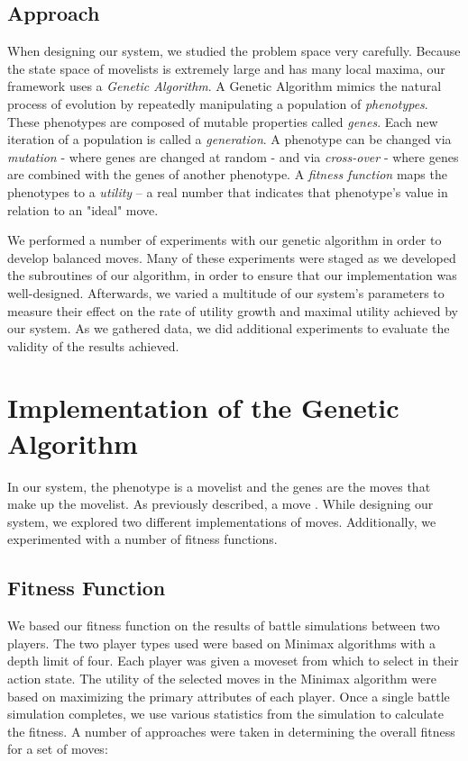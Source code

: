 \documentclass{acm_proc_article-sp}
\begin{document}
\subsection{Approach}

When designing our system, we studied the problem space very carefully. Because the state space of movelists is extremely large and has many local maxima, our framework uses a \textit{Genetic Algorithm}. A Genetic Algorithm mimics the natural process of evolution by repeatedly manipulating a population of \textit{phenotypes}. These phenotypes are composed of mutable properties called \textit{genes}. Each new iteration of a population is called a \textit{generation}. A phenotype can be changed via \textit{mutation} - where genes are changed at random - and via \textit{cross-over} - where genes are combined with the genes of another phenotype. A \textit{fitness function} maps the phenotypes to a \textit{utility} -- a real number that indicates that phenotype's value in relation to an "ideal" move. 

We performed a number of experiments with our genetic algorithm in order to develop balanced moves. Many of these experiments were staged as we developed the subroutines of our algorithm, in order to ensure that our implementation was well-designed. Afterwards, we varied a multitude of our system's parameters to measure their effect on the rate of utility growth and maximal utility achieved by our system. As we gathered data, we did additional experiments to evaluate the validity of the results achieved.

\section{Implementation of the Genetic Algorithm}

In our system, the phenotype is a movelist and the genes are the moves that make up the movelist. As previously described, a move . While designing our system, we explored two different implementations of moves. Additionally, we experimented with a number of fitness functions.

\subsection{Fitness Function}

We based our fitness function on the results of battle simulations between two players.  The two player types used were based on Minimax algorithms with a depth limit of four. Each player was given a moveset from which to select in their action state. The utility of the selected moves in the Minimax algorithm were based on maximizing the primary attributes of each player.
Once a single battle simulation completes, we use various statistics from the simulation to calculate the fitness. A number of approaches were taken in determining the overall fitness for a set of moves:
\end{document}
